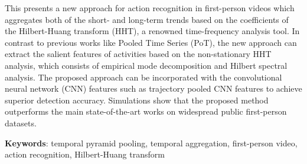 
This  presents a new approach for action recognition in
first-person videos which aggregates both of the short- and
long-term trends based on the coefficients of the Hilbert-Huang
transform (HHT), a renowned time-frequency analysis tool. In
contrast to previous works like Pooled Time Series (PoT), the new
approach can extract the salient features of activities based on the
non-stationary HHT analysis, which consists of empirical mode
decomposition and Hilbert spectral analysis. The proposed approach
can be incorporated with the convolutional neural network (CNN)
features such as trajectory pooled CNN features to
achieve superior detection accuracy. Simulations show that
the proposed method outperforms the main state-of-the-art works on
 widespread public first-person datasets.

\textbf{Keywords}: temporal pyramid pooling, temporal
aggregation, first-person video, action recognition, Hilbert-Huang transform